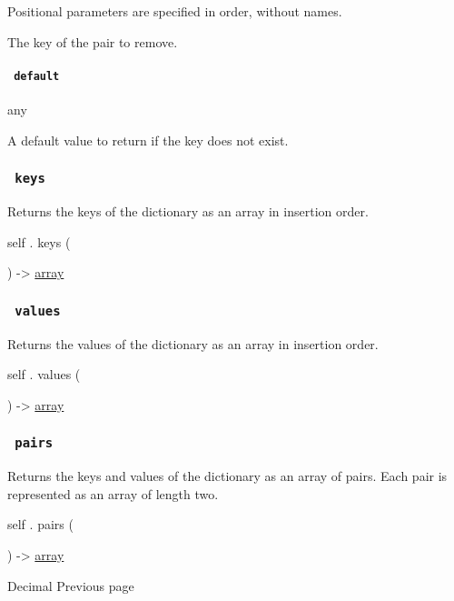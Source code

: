 \label{definitions-remove-key-positional-tooltip}
Positional parameters are specified in order, without names.

The key of the pair to remove.

\paragraph{\texorpdfstring{\texttt{\ default\ }}{ default }}\label{definitions-remove-default}

{ any }

A default value to return if the key does not exist.

\subsubsection{\texorpdfstring{\texttt{\ keys\ }}{ keys }}\label{definitions-keys}

Returns the keys of the dictionary as an array in insertion order.

self { . } { keys } (

) -\textgreater{} \href{/docs/reference/foundations/array/}{array}

\subsubsection{\texorpdfstring{\texttt{\ values\ }}{ values }}\label{definitions-values}

Returns the values of the dictionary as an array in insertion order.

self { . } { values } (

) -\textgreater{} \href{/docs/reference/foundations/array/}{array}

\subsubsection{\texorpdfstring{\texttt{\ pairs\ }}{ pairs }}\label{definitions-pairs}

Returns the keys and values of the dictionary as an array of pairs. Each
pair is represented as an array of length two.

self { . } { pairs } (

) -\textgreater{} \href{/docs/reference/foundations/array/}{array}

\href{/docs/reference/foundations/decimal/}{\pandocbounded{}}

{ Decimal } { Previous page }

